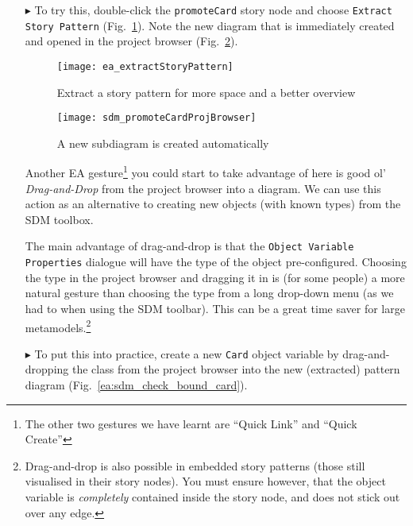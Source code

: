 \begin{itemize}

\item[$\blacktriangleright$] To try this, double-click the \texttt{promoteCard} story node and choose \texttt{Extract Story Pattern}
(Fig.~\ref{ea:sdm_check_extract_storypattern}). Note the new diagram that is immediately created and opened in the project browser
(Fig.~\ref{ea:sdm_new_sub_diagram}).

\begin{figure}[htbp]
\begin{center}
  \texttt{[image: ea\_extractStoryPattern]}
  \caption{Extract a story pattern for more space and a better overview}
  \label{ea:sdm_check_extract_storypattern}
\end{center}
\end{figure}

\begin{figure}[htbp]
\begin{center}
  \texttt{[image: sdm\_promoteCardProjBrowser]}
  \caption{A new subdiagram is created automatically}
  \label{ea:sdm_new_sub_diagram}
\end{center}
\end{figure}

\newpage

Another EA gesture\footnote{The other two gestures we have learnt are ``Quick Link'' and ``Quick Create''} you could start to take advantage of here is good
ol' \emph{Drag-and-Drop} from the project browser into a diagram. We can use this action as an alternative to creating new objects (with known types) from
the SDM toolbox.

The main advantage of drag-and-drop is that the \texttt{Object Variable Pro\-per\-ties} dialogue will have the type of the object pre-configured. Choosing
the type in the project browser and dragging it in is (for some people) a more natural gesture than choosing the type from a long drop-down menu (as we had to
when using the SDM toolbar). This can be a great time saver for large metamodels.\footnote{Drag-and-drop is also possible in embedded story patterns
(those still visualised in their story nodes).  You must ensure however, that the object variable is \emph{completely} contained inside the story node, and does
not stick out over any edge.}

\vspace{0.5cm}

\item[$\blacktriangleright$] To put this into practice, create a new \texttt{Card} object variable by drag-and-dropping the class from the project browser
into the new (extracted) pattern diagram (Fig.~\ref{ea:sdm_check_bound_card}).


\end{itemize}
